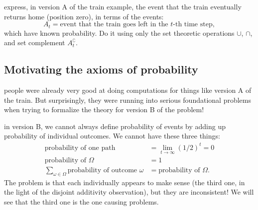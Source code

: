 \documentclass{article}
\begin{document}
 express, in version A of the train example, the event that the train eventually returns home (position zero), in terms of the events: 
\[ A_t = \text{event that the train goes left in the $t$-th time step},\]
which have known probability. Do it using only the set theoretic operations $\cup$, $\cap$, and set complement $A_t^\complement$.


\subsection{Motivating the axioms of probability}

 people were already very good at doing computations for things like version A of the train. But surprisingly, they were running into serious foundational problems when trying to formalize the theory for version B of the problem!

 in version B, we cannot always define probability of events by adding up probability of individual outcomes. We cannot have these three things:
\begin{align*}
	\text{probability of one path} &= \lim_{t \to \infty} (1/2)^t = 0 \\
	\text{probability of $\Omega$} &= 1 \\
	\sum_{\omega \in \Omega} \text{probability of outcome $\omega$} &= \text{probability of $\Omega$}.
\end{align*}
The problem is that each individually appears to make sense (the third one, in the light of the disjoint additivity observation), but they are inconsistent! We will see that the third one is the one causing problems.
\end{document}
